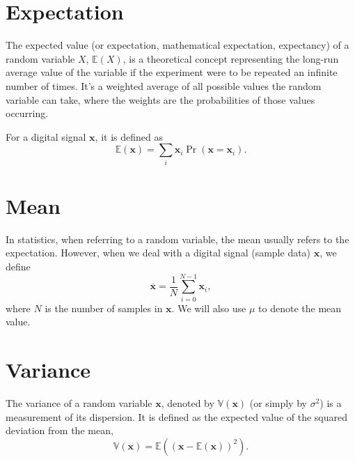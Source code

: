 
\section{Expectation}
The expected value (or expectation, mathematical expectation,
expectancy) of a random variable $X$, $\mathbb{E}(X)$, is a
theoretical concept representing the long-run average value of the
variable if the experiment were to be repeated an infinite number of
times. It's a weighted average of all possible values the random
variable can take, where the weights are the probabilities of those
values occurring.

For a digital signal $\mathbf{x}$, it is defined as
\begin{equation}
  \mathbb{E}(\mathbf{x})=\sum_i\mathbf{x}_i\Pr(\mathbf{x}=\mathbf{x}_i).
\end{equation}

\section{Mean}
In statistics, when referring to a random variable, the mean usually
refers to the expectation. However, when we deal with a digital signal
(sample data) $\mathbf{x}$, we define
\begin{equation}
  \overline{\mathbf{x}} = \frac{1}{N}\sum_{i=0}^{N-1}\mathbf{x}_i,
\end{equation}
where $N$ is the number of samples in $\mathbf{x}$. We will also use
$\mu$ to denote the mean value.

\section{Variance}
\label{sec:variance}

The variance of a random variable $\mathbf{x}$, denoted by
$\mathbb{V}(\mathbf{x})$ (or simply by $\sigma^2$) is a measurement of
its dispersion. It is defined as the expected value of the squared
deviation from the mean,
\begin{equation}
  \mathbb{V}(\mathbf{x}) = \mathbb{E}\left((\mathbf{x} - \mathbb{E}(\mathbf{x}))^2 \right).
  \label{eq:variance}
\end{equation}

